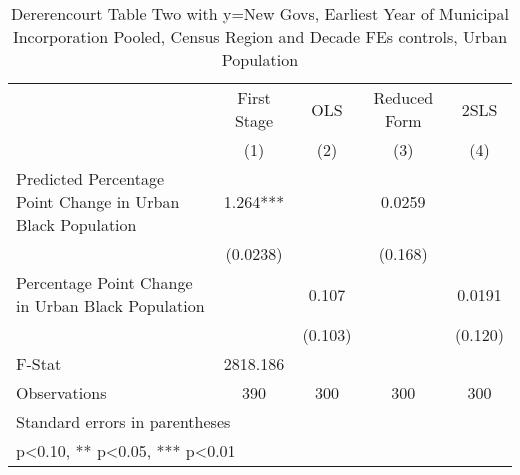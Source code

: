 \begin{table}[htbp]\centering
\def\sym#1{\ifmmode^{#1}\else\(^{#1}\)\fi}
\caption{Dererencourt Table Two with y=New Govs, Earliest Year of Municipal Incorporation  Pooled, Census Region and Decade FEs controls, Urban Population}
\begin{tabular}{l*{4}{c}}
\toprule
                    & First Stage   &         OLS   &Reduced Form   &        2SLS   \\
                    &\multicolumn{1}{c}{(1)}   &\multicolumn{1}{c}{(2)}   &\multicolumn{1}{c}{(3)}   &\multicolumn{1}{c}{(4)}   \\
\midrule
Predicted Percentage Point Change in Urban Black Population&       1.264***&               &      0.0259   &               \\
                    &    (0.0238)   &               &     (0.168)   &               \\
\addlinespace
Percentage Point Change in Urban Black Population&               &       0.107   &               &      0.0191   \\
                    &               &     (0.103)   &               &     (0.120)   \\
\midrule
F-Stat              &    2818.186   &               &               &               \\
Observations        &         390   &         300   &         300   &         300   \\
\bottomrule
\multicolumn{5}{l}{\footnotesize Standard errors in parentheses}\\
\multicolumn{5}{l}{\footnotesize * p<0.10, ** p<0.05, *** p<0.01}\\
\end{tabular}
\end{table}
